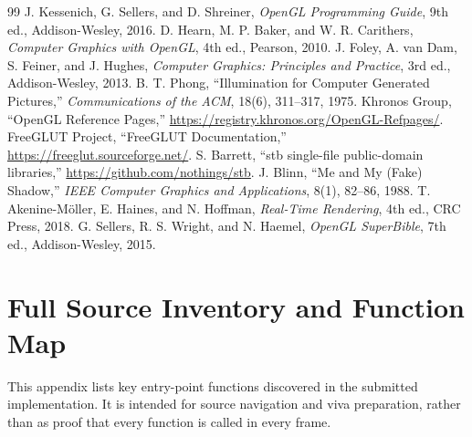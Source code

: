 \documentclass[10pt,a4paper,oneside]{article}
\begin{document}
\begin{thebibliography}{99}
 J. Kessenich, G. Sellers, and D. Shreiner, \emph{OpenGL Programming Guide}, 9th ed., Addison-Wesley, 2016.
 D. Hearn, M. P. Baker, and W. R. Carithers, \emph{Computer Graphics with OpenGL}, 4th ed., Pearson, 2010.
 J. Foley, A. van Dam, S. Feiner, and J. Hughes, \emph{Computer Graphics: Principles and Practice}, 3rd ed., Addison-Wesley, 2013.
 B. T. Phong, ``Illumination for Computer Generated Pictures,'' \emph{Communications of the ACM}, 18(6), 311--317, 1975.
 Khronos Group, ``OpenGL Reference Pages,'' \url{https://registry.khronos.org/OpenGL-Refpages/}.
 FreeGLUT Project, ``FreeGLUT Documentation,'' \url{https://freeglut.sourceforge.net/}.
 S. Barrett, ``stb single-file public-domain libraries,'' \url{https://github.com/nothings/stb}.
 J. Blinn, ``Me and My (Fake) Shadow,'' \emph{IEEE Computer Graphics and Applications}, 8(1), 82--86, 1988.
 T. Akenine-M\"oller, E. Haines, and N. Hoffman, \emph{Real-Time Rendering}, 4th ed., CRC Press, 2018.
 G. Sellers, R. S. Wright, and N. Haemel, \emph{OpenGL SuperBible}, 7th ed., Addison-Wesley, 2015.
\end{thebibliography}
\appendix
\section{Full Source Inventory and Function Map}
This appendix lists key entry-point functions discovered in the submitted implementation. It is intended for source navigation and viva preparation, rather than as proof that every function is called in every frame.

\subsection{\texttt{}}
\end{document}
